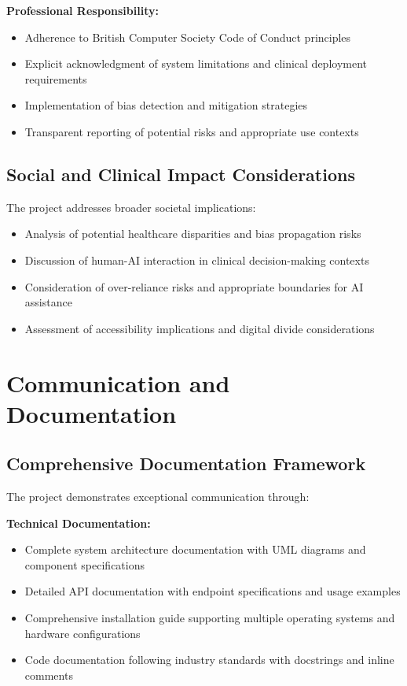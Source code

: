 \textbf{Professional Responsibility:}
\begin{itemize}
    \item Adherence to British Computer Society Code of Conduct principles
    \item Explicit acknowledgment of system limitations and clinical deployment requirements
    \item Implementation of bias detection and mitigation strategies
    \item Transparent reporting of potential risks and appropriate use contexts
\end{itemize}

\subsection{Social and Clinical Impact Considerations}
The project addresses broader societal implications:
\begin{itemize}
    \item Analysis of potential healthcare disparities and bias propagation risks
    \item Discussion of human-AI interaction in clinical decision-making contexts
    \item Consideration of over-reliance risks and appropriate boundaries for AI assistance
    \item Assessment of accessibility implications and digital divide considerations
\end{itemize}

\section{Communication and Documentation}

\subsection{Comprehensive Documentation Framework}
The project demonstrates exceptional communication through:

\textbf{Technical Documentation:}
\begin{itemize}
    \item Complete system architecture documentation with UML diagrams and component specifications
    \item Detailed API documentation with endpoint specifications and usage examples
    \item Comprehensive installation guide supporting multiple operating systems and hardware configurations
    \item Code documentation following industry standards with docstrings and inline comments
\end{itemize}

